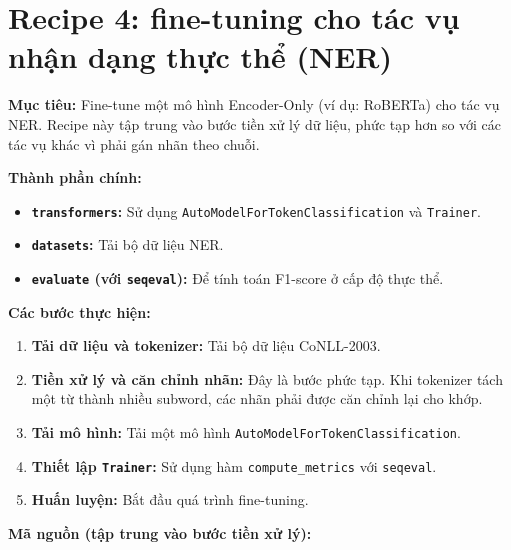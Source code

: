 
\section{Recipe 4: fine-tuning cho tác vụ nhận dạng thực thể (NER)}
\label{sec:recipe_ner_finetuning}

\textbf{Mục tiêu:} Fine-tune một mô hình Encoder-Only (ví dụ: RoBERTa) cho tác vụ NER. Recipe này tập trung vào bước tiền xử lý dữ liệu, phức tạp hơn so với các tác vụ khác vì phải gán nhãn theo chuỗi.

\textbf{Thành phần chính:}
\begin{itemize}
    \item \textbf{\texttt{transformers}:} Sử dụng \texttt{Auto\allowbreak Model\allowbreak For\allowbreak Token\allowbreak Classification} và \texttt{Trainer}.
    \item \textbf{\texttt{datasets}:} Tải bộ dữ liệu NER.
    \item \textbf{\texttt{evaluate} (với \texttt{seqeval}):} Để tính toán F1-score ở cấp độ thực thể.
\end{itemize}

\textbf{Các bước thực hiện:}
\begin{enumerate}
    \item \textbf{Tải dữ liệu và tokenizer:} Tải bộ dữ liệu CoNLL-2003.
    \item \textbf{Tiền xử lý và căn chỉnh nhãn:} Đây là bước phức tạp. Khi tokenizer tách một từ thành nhiều subword, các nhãn phải được căn chỉnh lại cho khớp.
    \item \textbf{Tải mô hình:} Tải một mô hình \texttt{Auto\allowbreak Model\allowbreak For\allowbreak Token\allowbreak Classification}.
    \item \textbf{Thiết lập \texttt{Trainer}:} Sử dụng hàm \texttt{compute\_metrics} với \texttt{seqeval}.
    \item \textbf{Huấn luyện:} Bắt đầu quá trình fine-tuning.
\end{enumerate}


\textbf{Mã nguồn (tập trung vào bước tiền xử lý):}

